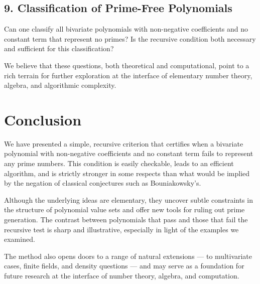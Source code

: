 \documentclass[a4paper,11pt]{article}
\begin{document}
\subsection*{9. Classification of Prime-Free Polynomials}

Can one classify all bivariate polynomials with non-negative coefficients and no constant term that represent no primes? Is the recursive condition both necessary and sufficient for this classification?

\vspace{1em}

We believe that these questions, both theoretical and computational, point to a rich terrain for further exploration at the interface of elementary number theory, algebra, and algorithmic complexity.
	\section{Conclusion}
	
	We have presented a simple, recursive criterion that certifies when a bivariate polynomial with non-negative coefficients and no constant term fails to represent any prime numbers. This condition is easily checkable, leads to an efficient algorithm, and is strictly stronger in some respects than what would be implied by the negation of classical conjectures such as Bouniakowsky's.
	
	Although the underlying ideas are elementary, they uncover subtle constraints in the structure of polynomial value sets and offer new tools for ruling out prime generation. The contrast between polynomials that pass and those that fail the recursive test is sharp and illustrative, especially in light of the examples we examined.
	
	The method also opens doors to a range of natural extensions — to multivariate cases, finite fields, and density questions — and may serve as a foundation for future research at the interface of number theory, algebra, and computation.
	
	
	
\end{document}
